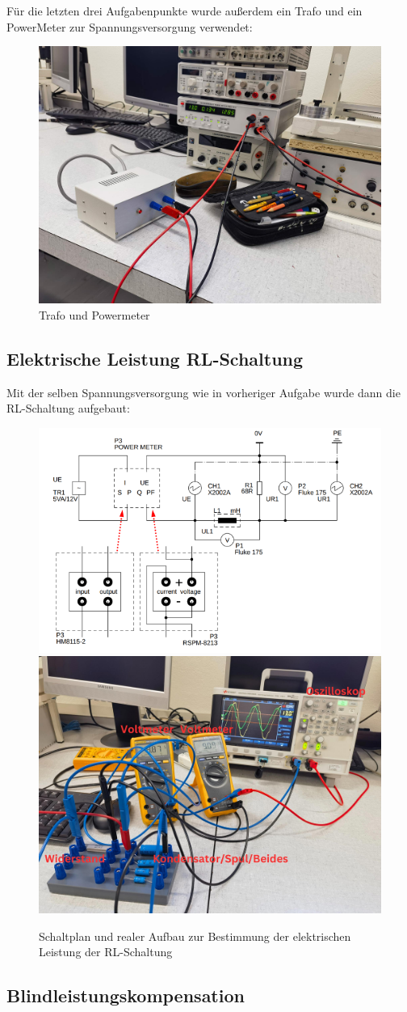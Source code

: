 \documentclass[12pt,a4paper,twoside]{article}
\begin{document}
\noindent
Für die letzten drei Aufgabenpunkte wurde außerdem ein Trafo und ein PowerMeter zur Spannungsversorgung verwendet:

\begin{figure}[H]
    \centering
    \includegraphics[width=0.4\linewidth]{nudes/PhaseLeistungBilder/Trafo,Powermeter.jpg}
    \caption{Trafo und Powermeter}
    \label{fig:TrafoPowerMeter}
\end{figure}


\subsection{Elektrische Leistung RL-Schaltung}

Mit der selben Spannungsversorgung wie in vorheriger Aufgabe wurde dann die RL-Schaltung aufgebaut:

\begin{figure}[H]
    \centering
    \includegraphics[width=0.4\linewidth]{nudes/Schaltplan6.PNG}
    \includegraphics[width=0.4\linewidth]{nudes/PhaseLeistungBilder/Aufbau5,6,7.jpg}
    \caption{Schaltplan und realer Aufbau zur Bestimmung der elektrischen Leistung der RL-Schaltung}
    \label{fig:Aufbau6}
\end{figure}



\subsection{Blindleistungskompensation}
\end{document}
